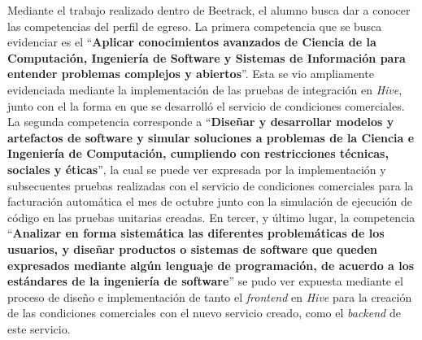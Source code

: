 Mediante el trabajo realizado dentro de Beetrack, el alumno busca dar a conocer las competencias del perfil de egreso. La primera competencia que se busca evidenciar es el ``\textbf{Aplicar conocimientos avanzados de Ciencia de la Computación, Ingeniería de Software y Sistemas de Información para entender problemas complejos y abiertos}''. Esta se vio ampliamente evidenciada mediante la implementación de las pruebas de integración en \textit{Hive}, junto con el la forma en que se desarrolló el servicio de condiciones comerciales. La segunda competencia corresponde a ``\textbf{Diseñar y desarrollar modelos y artefactos de software y simular soluciones a problemas de la Ciencia e Ingeniería de Computación, cumpliendo con restricciones técnicas, sociales y éticas}'', la cual se puede ver expresada por la implementación y subsecuentes pruebas realizadas con el servicio de condiciones comerciales para la facturación automática el mes de octubre junto con la simulación de ejecución de código en las pruebas unitarias creadas. En tercer, y último lugar, la competencia ``\textbf{Analizar en forma sistemática las diferentes problemáticas de los usuarios, y diseñar productos o sistemas de software que queden expresados mediante algún lenguaje de programación, de acuerdo a los estándares de la ingeniería de software}'' se pudo ver expuesta mediante el proceso de diseño e implementación de tanto el \textit{frontend} en \textit{Hive} para la creación de las condiciones comerciales con el nuevo servicio creado, como el \textit{backend} de este servicio.
